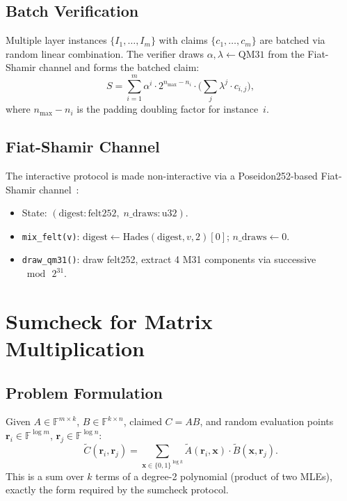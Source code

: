 \documentclass[10pt,twocolumn]{article}
\theoremstyle{definition}
\theoremstyle{remark}
\newcommand{\F}{\mathbb{F}}
\newcommand{\QM}{\mathrm{QM31}}
\newcommand{\MLE}{\widetilde}
\begin{document}
\subsection{Batch Verification}

Multiple layer instances $\{I_1,\ldots,I_m\}$ with claims
$\{c_1,\ldots,c_m\}$ are batched via random linear combination.
The verifier draws $\alpha,\lambda\leftarrow\QM$ from the Fiat-Shamir
channel and forms the batched claim:
\begin{equation}\label{eq:batch}
  S = \sum_{i=1}^{m} \alpha^i \cdot 2^{n_{\max}-n_i} \cdot
  \biggl(\sum_j \lambda^j \cdot c_{i,j}\biggr),
\end{equation}
where $n_{\max}-n_i$ is the padding doubling factor for instance~$i$.

\subsection{Fiat-Shamir Channel}

The interactive protocol is made non-interactive via a Poseidon252-based
Fiat-Shamir channel~\cite{fiat1986prove}:
\begin{itemize}[nosep,leftmargin=1.2em]
  \item State: $(\text{digest}: \text{felt252},\; n\_\text{draws}: \text{u32})$.
  \item \texttt{mix\_felt(v)}: $\text{digest} \leftarrow
        \text{Hades}(\text{digest}, v, 2)[0]$; $n\_\text{draws}\leftarrow 0$.
  \item \texttt{draw\_qm31()}: draw felt252, extract 4 M31 components
        via successive $\bmod\,2^{31}$.
\end{itemize}


\section{Sumcheck for Matrix Multiplication}\label{sec:sumcheck}

\subsection{Problem Formulation}

Given $A\in\F^{m\times k}$, $B\in\F^{k\times n}$, claimed $C=AB$,
and random evaluation points $\mathbf{r}_i\in\F^{\log m}$,
$\mathbf{r}_j\in\F^{\log n}$:
\begin{equation}\label{eq:matmul-sumcheck}
  \MLE{C}(\mathbf{r}_i,\mathbf{r}_j)
  = \sum_{\mathbf{x}\in\{0,1\}^{\log k}}
    \MLE{A}(\mathbf{r}_i,\mathbf{x})\cdot\MLE{B}(\mathbf{x},\mathbf{r}_j).
\end{equation}
This is a sum over $k$ terms of a degree-2 polynomial (product of two
MLEs), exactly the form required by the sumcheck protocol.
\end{document}
